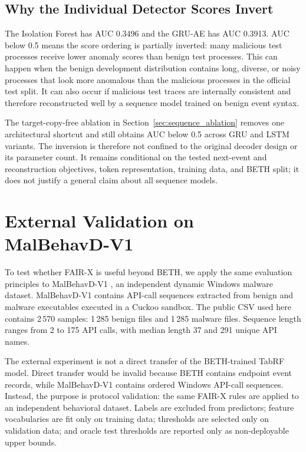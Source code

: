 \documentclass[10pt,journal,compsoc]{IEEEtran}
\begin{document}
\subsection{Why the Individual Detector Scores Invert}

The Isolation Forest has AUC 0.3496 and the GRU-AE has AUC 0.3913. AUC below 0.5 means the score ordering is partially inverted: many malicious test processes receive lower anomaly scores than benign test processes. This can happen when the benign development distribution contains long, diverse, or noisy processes that look more anomalous than the malicious processes in the official test split. It can also occur if malicious test traces are internally consistent and therefore reconstructed well by a sequence model trained on benign event syntax.

The target-copy-free ablation in Section~\ref{sec:sequence_ablation} removes one architectural shortcut and still obtains AUC below 0.5 across GRU and LSTM variants. The inversion is therefore not confined to the original decoder design or its parameter count. It remains conditional on the tested next-event and reconstruction objectives, token representation, training data, and BETH split; it does not justify a general claim about all sequence models.

\section{External Validation on MalBehavD-V1}
\label{sec:external_malbehavd}

To test whether FAIR-X is useful beyond BETH, we apply the same evaluation principles to MalBehavD-V1 \cite{maniriho2023,malbehavd2023}, an independent dynamic Windows malware dataset. MalBehavD-V1 contains API-call sequences extracted from benign and malware executables executed in a Cuckoo sandbox. The public CSV used here contains 2\,570 samples: 1\,285 benign files and 1\,285 malware files. Sequence length ranges from 2 to 175 API calls, with median length 37 and 291 unique API names.

The external experiment is not a direct transfer of the BETH-trained TabRF model. Direct transfer would be invalid because BETH contains endpoint event records, while MalBehavD-V1 contains ordered Windows API-call sequences. Instead, the purpose is protocol validation: the same FAIR-X rules are applied to an independent behavioral dataset. Labels are excluded from predictors; feature vocabularies are fit only on training data; thresholds are selected only on validation data; and oracle test thresholds are reported only as non-deployable upper bounds.
\end{document}
